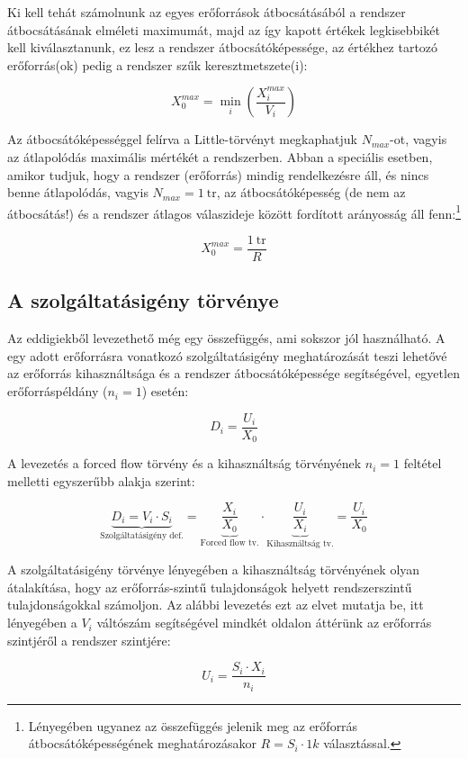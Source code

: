 Ki kell tehát számolnunk az egyes erőforrások átbocsátásából a rendszer átbocsátásának elméleti maximumát, majd az így kapott értékek legkisebbikét kell kiválasztanunk, ez lesz a rendszer átbocsátóképessége, az értékhez tartozó erőforrás(ok) pedig a rendszer szűk keresztmetszete(i):

$$X_0^{max} = \min_i\left(\frac{X_i^{max}}{V_i}\right)$$

Az átbocsátóképességgel felírva a Little-törvényt megkaphatjuk $N_{max}$-ot, vagyis az átlapolódás maximális mértékét a rendszerben. Abban a speciális esetben, amikor tudjuk, hogy a rendszer (erőforrás) mindig rendelkezésre áll, és nincs benne átlapolódás, vagyis $N_{max} = 1~\mathrm{tr}$, az átbocsátóképesség (de nem az átbocsátás!) és a rendszer átlagos válaszideje között fordított arányosság áll fenn:\footnote{Lényegében ugyanez az összefüggés jelenik meg az erőforrás átbocsátóképességének meghatározásakor $R = S_i \cdot 1k$ választással.}

$$X_0^{max} = \frac{1~\mathrm{tr}}{R}$$

\subsection{A szolgáltatásigény törvénye}

Az eddigiekből levezethető még egy összefüggés, ami sokszor jól használható. A  egy adott erőforrásra vonatkozó szolgáltatásigény meghatározását teszi lehetővé az erőforrás kihasználtsága és a rendszer átbocsátóképessége segítségével, egyetlen erőforráspéldány ($n_i = 1$) esetén:

$$D_i = \frac{U_i}{X_0}$$

A levezetés a forced flow törvény és a kihasználtság törvényének $n_i = 1$ feltétel melletti egyszerűbb alakja szerint:

$$\underbrace{D_i = V_i \cdot S_i}_\textrm{Szolgáltatásigény def.} =
\underbrace{\frac{X_i}{X_0}}_\textrm{Forced flow tv.} \cdot
\underbrace{\frac{U_i}{X_i}}_\textrm{Kihasználtság tv.} = \frac{U_i}{X_0}$$

A szolgáltatásigény törvénye lényegében a kihasználtság törvényének olyan átalakítása, hogy az erőforrás-szintű tulajdonságok helyett rendszerszintű tulajdonságokkal számoljon. Az alábbi levezetés ezt az elvet mutatja be, itt lényegében a $V_i$ váltószám segítségével mindkét oldalon áttérünk az erőforrás szintjéről a rendszer szintjére:

$$U_i = \frac{S_i \cdot X_i}{n_i}$$

